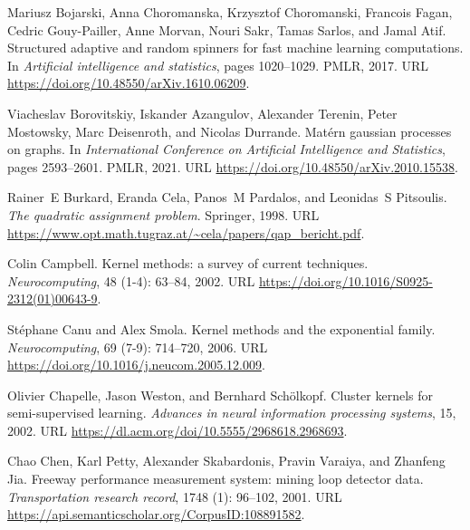 \begin{thebibliography}{76}
Mariusz Bojarski, Anna Choromanska, Krzysztof Choromanski, Francois Fagan, Cedric Gouy-Pailler, Anne Morvan, Nouri Sakr, Tamas Sarlos, and Jamal Atif.
\newblock Structured adaptive and random spinners for fast machine learning computations.
\newblock In \emph{Artificial intelligence and statistics}, pages 1020--1029. PMLR, 2017.
\newblock URL \url{https://doi.org/10.48550/arXiv.1610.06209}.

Viacheslav Borovitskiy, Iskander Azangulov, Alexander Terenin, Peter Mostowsky, Marc Deisenroth, and Nicolas Durrande.
\newblock Mat{\'e}rn gaussian processes on graphs.
\newblock In \emph{International Conference on Artificial Intelligence and Statistics}, pages 2593--2601. PMLR, 2021.
\newblock URL \url{https://doi.org/10.48550/arXiv.2010.15538}.

Rainer~E Burkard, Eranda Cela, Panos~M Pardalos, and Leonidas~S Pitsoulis.
\newblock \emph{The quadratic assignment problem}.
\newblock Springer, 1998.
\newblock URL \url{https://www.opt.math.tugraz.at/~cela/papers/qap_bericht.pdf}.

Colin Campbell.
\newblock Kernel methods: a survey of current techniques.
\newblock \emph{Neurocomputing}, 48 (1-4): 63--84, 2002.
\newblock URL \url{https://doi.org/10.1016/S0925-2312(01)00643-9}.

St{\'e}phane Canu and Alex Smola.
\newblock Kernel methods and the exponential family.
\newblock \emph{Neurocomputing}, 69 (7-9): 714--720, 2006.
\newblock URL \url{https://doi.org/10.1016/j.neucom.2005.12.009}.

Olivier Chapelle, Jason Weston, and Bernhard Sch{\"o}lkopf.
\newblock Cluster kernels for semi-supervised learning.
\newblock \emph{Advances in neural information processing systems}, 15, 2002.
\newblock URL \url{https://dl.acm.org/doi/10.5555/2968618.2968693}.

Chao Chen, Karl Petty, Alexander Skabardonis, Pravin Varaiya, and Zhanfeng Jia.
\newblock Freeway performance measurement system: mining loop detector data.
\newblock \emph{Transportation research record}, 1748 (1): 96--102, 2001.
\newblock URL \url{https://api.semanticscholar.org/CorpusID:108891582}.


\end{thebibliography}
